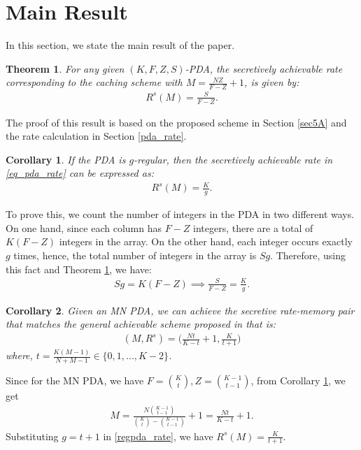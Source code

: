 \documentclass[conference]{IEEEtran}
\newtheorem{thm}{Theorem}
\newtheorem{cor}{Corollary}
\begin{document}
\section{Main Result}\label{sec4}
In this section, we state the main result of the paper.
\begin{thm}
	\label{scc_rate}
	For any given $(K,F,Z,S)$-PDA, the secretively achievable rate corresponding to the caching scheme with $M=\frac{NZ}{F-Z}+1$, is given by:
	\begin{align}\label{eq_pda_rate}
	R^s(M)=\frac{S}{F-Z}.
	\end{align}
\end{thm}
 \begin{IEEEproof}
 The proof of this result is based on the proposed scheme in Section \ref{sec5A} and the rate calculation in Section \ref{pda_rate}.
\end{IEEEproof}
\begin{cor}\label{cor1}
	If the PDA is $g$-regular, then the secretively achievable rate in \eqref{eq_pda_rate} can be expressed as:
	\begin{align}\label{regpda_rate}
	R^s(M)=\frac{K}{g}.
	\end{align}
\end{cor}
\begin{IEEEproof}
	To prove this, we count the number of integers in the PDA in two different ways. On one hand, since each column has $F-Z$ integers, there are a total of $K(F-Z)$ integers in the array. On the other hand, each integer occurs exactly $g$ times, hence, the total number of integers in the array is $Sg$. Therefore, using this fact and Theorem \ref{scc_rate}, we have:
	\begin{align*}
	Sg=K(F-Z)\implies \frac{S}{F-Z}=\frac{K}{g}.
	\end{align*}
\end{IEEEproof}
\begin{cor}\label{cor2}
	Given an MN PDA,  we can achieve the secretive rate-memory pair that matches the general achievable scheme proposed in \cite{PrivateCc} that is:
	\begin{align}
	   (M,R^s)=\Big(\frac{Nt}{K-t}+1,\frac{K}{t+1}\Big) 
	\end{align}
	where, $t=\frac{K(M-1)}{N+M-1}\in\{0,1,...,K-2\}$. 
\end{cor} 
\begin{IEEEproof} Since for the MN PDA, we have $F=\binom{K}{t},Z=\binom{K-1}{t-1}$, from Corollary \ref{cor1}, we get
	\begin{align}
	M=\frac{N\binom{K-1}{t-1}}{\binom{K}{t}-\binom{K-1}{t-1}}+1=\frac{Nt}{K-t}+1.
	\end{align}
	Substituting $g=t+1$ in \eqref{regpda_rate}, we have $R^s(M)=\frac{K}{t+1}$.
\end{IEEEproof}
\end{document}
